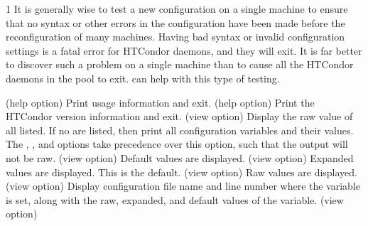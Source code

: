 \begin{ManPage}{\label{man-condor-config-val}}{1}
It is generally wise to test a new configuration on a single
machine to ensure that no syntax or other errors in the
configuration have been made before the reconfiguration of many machines.  
Having bad syntax or invalid configuration settings is a fatal error
for HTCondor daemons, and they will exit.
It is far better to discover such a problem on a single machine than to
cause all the HTCondor daemons in the pool to exit.
 can help with this type of testing.

\begin{Options}
   {(help option) 
    Print usage information and exit.
   }
   {(help option) 
    Print the HTCondor version information and exit.
   }
   {(view option)
    Display the raw value of all  listed.  
    If no  are listed, then print all configuration variables and
    their values.
    The , , and  options take
    precedence over this  option, such that the output will 
    not be raw.
   }
   {(view option)
    Default values are displayed.
   }
   {(view option)
    Expanded values are displayed.  This is the default.
   }
   {(view option)
    Raw values are displayed.
   }
   {(view option)
    Display configuration file name and line number where the variable is
    set, along with the raw, expanded, and default values of the variable.
   }
   {(view option)
}
\end{Options}
\end{ManPage}
